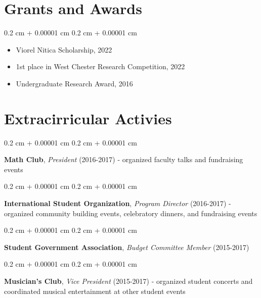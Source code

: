 \documentclass[10pt, letterpaper]{article}
\newenvironment{highlightsforbulletentries}{
    \begin{itemize}[
        topsep=0.10 cm,
        parsep=0.10 cm,
        partopsep=0pt,
        itemsep=0pt,
        leftmargin=10pt
    ]
}{
    \end{itemize}
} %
\newenvironment{onecolentry}{
    \begin{adjustwidth}{
        0.2 cm + 0.00001 cm
    }{
        0.2 cm + 0.00001 cm
    }
}{
    \end{adjustwidth}
} %
\begin{document}
    
    \section{Grants and Awards}

    \begin{onecolentry}
        \begin{highlightsforbulletentries}


        \item Viorel Nitica Scholarship, 2022

        \item 1st place in West Chester Research Competition, 2022

        \item Undergraduate Research Award, 2016


        \end{highlightsforbulletentries}
    \end{onecolentry}

    \section{Extracirricular Activies}



        
        \begin{onecolentry}
            \textbf{Math Club}, \textit{President} (2016-2017) - organized faculty talks and fundraising events
        \end{onecolentry}

        \vspace{0.2 cm}

        \begin{onecolentry}
            \textbf{International Student Organization}, \textit{Program Director} (2016-2017) - organized community building events, celebratory dinners, and fundraising events
        \end{onecolentry}

        \vspace{0.2 cm}

        \begin{onecolentry}
            \textbf{Student Government Association}, \textit{Budget Committee Member} (2015-2017)
        \end{onecolentry}

        \vspace{0.2 cm}

        \begin{onecolentry}
            \textbf{Musician's Club}, \textit{Vice President} (2015-2017) - organized student concerts and coordinated musical entertainment at other student events
        \end{onecolentry}
\end{document}
